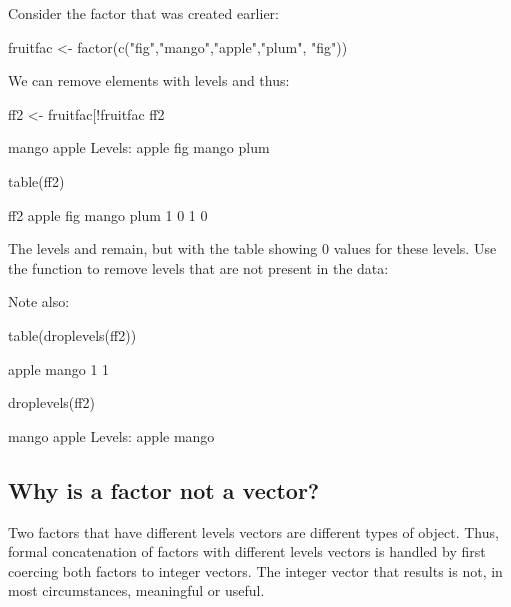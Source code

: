 Consider the factor  that was created earlier:
\begin{Schunk}
\begin{Sinput}
fruitfac <- factor(c("fig","mango","apple","plum", "fig"))
\end{Sinput}
\end{Schunk}
We can remove elements with levels  and  thus:
\begin{Schunk}
\begin{Sinput}
ff2 <- fruitfac[!fruitfac %
ff2
\end{Sinput}
\begin{Soutput}
[1] mango apple
Levels: apple fig mango plum
\end{Soutput}
\begin{Sinput}
table(ff2)
\end{Sinput}
\begin{Soutput}
ff2
apple   fig mango  plum 
    1     0     1     0 
\end{Soutput}
\end{Schunk}
The levels  and  remain, but with
the table showing 0 values for these levels.  Use the function
 to remove levels that are not present in
the data:
\begin{marginfigure}
Note also:
\begin{Schunk}
\begin{Sinput}
table(droplevels(ff2))
\end{Sinput}
\begin{Soutput}

apple mango 
    1     1 
\end{Soutput}
\end{Schunk}
\end{marginfigure}
\begin{Schunk}
\begin{Sinput}
droplevels(ff2)
\end{Sinput}
\begin{Soutput}
[1] mango apple
Levels: apple mango
\end{Soutput}
\end{Schunk}

\subsection*{Why is a factor not a vector?}
Two factors   that
have different levels vectors are different types of object.  Thus,
formal concatenation of factors with different levels vectors is
handled by first coercing both factors to integer vectors.  The
integer vector that results is not, in most circumstances, meaningful
or useful.

